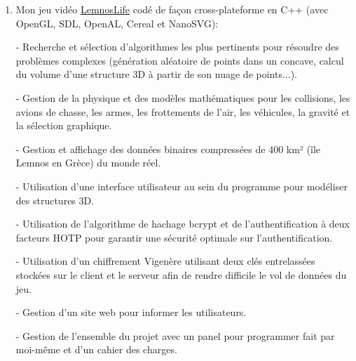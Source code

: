 \documentclass{article}
\begin{document}
		\begin{enumerate}

				\item Mon jeu vidéo \href{https://github.com/Benjamin-Loison/LemnosLife}{LemnosLife} codé de façon cross-plateforme en C++ (avec OpenGL, SDL, OpenAL, Cereal et NanoSVG):
				
					\newcommand{\tmp}[2]{#2}
					
					- Recherche et sélection d'algorithmes les plus pertinents pour résoudre des problèmes complexes (génération aléatoire de points dans un concave, calcul du volume d'une structure 3D à partir de son nuage de points...). %
				
					- \tmp{https://github.com/Benjamin-Loison/LemnosLife/tree/master/LaTex/Theory}{Gestion de la physique et des modèles mathématiques pour les collisions, les avions de chasse, les armes, les frottements de l'air, les véhicules, la gravité et la sélection graphique.}
				
					- \tmp{https://github.com/Benjamin-Loison/LemnosLife/tree/master/Client/LemnosLife/Map}{Gestion et affichage des données binaires compressées de 400 km² (île Lemnos en Grèce) du monde réel.}%
					
					- Utilisation d'une interface utilisateur au sein du programme pour modéliser des structures 3D.%
					
					- Utilisation de l'algorithme de hachage bcrypt et de l'authentification à deux facteurs HOTP pour garantir une sécurité optimale sur l'authentification.
					
					- Utilisation d'un chiffrement Vigenère utilisant deux clés entrelassées stockées sur le client et le serveur afin de rendre difficile le vol de données du jeu.
					
					- Gestion d'un site web pour informer les utilisateurs.
				
					- Gestion de l'ensemble du projet avec un \tmp{https://github.com/Benjamin-Loison/LemnosLife/tree/master/Panel}{panel pour programmer} fait par moi-même et \tmp{https://docs.google.com/document/d/1rnYh5uGzhmrSZ34OW5-3V3XZjxATDYzPypT43C2trjE}{d'un cahier des charges}.
				

\end{enumerate}
\end{document}
